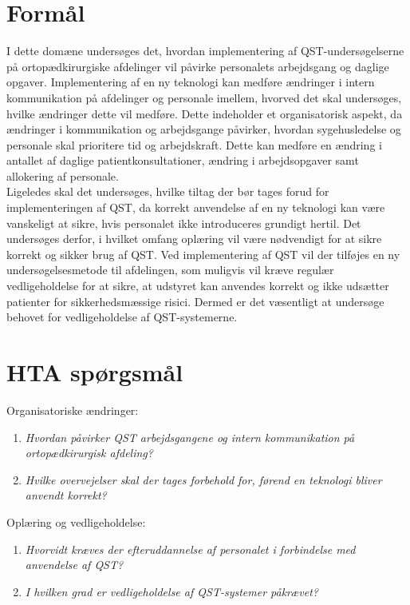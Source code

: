 \section{Formål}
I dette domæne undersøges det, hvordan implementering af QST-undersøgelserne på ortopædkirurgiske afdelinger vil påvirke personalets arbejdsgang og daglige opgaver. Implementering af en ny teknologi kan medføre ændringer i intern kommunikation  på afdelinger og personale imellem, hvorved det skal undersøges, hvilke ændringer dette vil medføre. Dette indeholder et organisatorisk aspekt, da ændringer i kommunikation og arbejdsgange påvirker, hvordan sygehusledelse og personale skal prioritere tid og arbejdskraft. Dette kan medføre en ændring i antallet af daglige patientkonsultationer, ændring i arbejdsopgaver samt allokering af personale. \\
Ligeledes skal det undersøges, hvilke tiltag der bør tages forud for implementeringen af QST, da korrekt anvendelse af en ny teknologi kan være vanskeligt at sikre, hvis personalet ikke introduceres grundigt hertil. Det undersøges derfor, i hvilket omfang oplæring vil være nødvendigt for at sikre korrekt og sikker brug af QST. Ved implementering af QST vil der tilføjes en ny undersøgelsesmetode til afdelingen, som muligvis vil kræve regulær vedligeholdelse for at sikre, at udstyret kan anvendes korrekt og ikke udsætter patienter for sikkerhedsmæssige risici. Dermed er det væsentligt at undersøge behovet for vedligeholdelse af QST-systemerne.

\section{HTA spørgsmål}
Organisatoriske ændringer:
\begin{enumerate}
	\item \textit{Hvordan påvirker QST arbejdsgangene og intern kommunikation på ortopædkirurgisk afdeling?} %
	\item \textit{Hvilke overvejelser skal der tages forbehold for, førend en teknologi bliver anvendt korrekt?} %
\end{enumerate}
Oplæring og vedligeholdelse:
\begin{enumerate}[resume]
	\item \textit{Hvorvidt kræves der efteruddannelse af personalet i forbindelse med anvendelse af QST?} %
	\item \textit{I hvilken grad er vedligeholdelse af QST-systemer påkrævet?} %
\end{enumerate}


